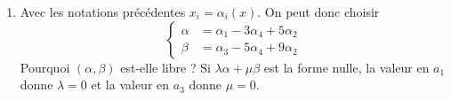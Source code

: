 \begin{enumerate}
 \item Avec les notations précédentes $x_i = \alpha_i(x)$. On peut donc choisir
\begin{displaymath}
 \left\lbrace 
\begin{aligned}
 \alpha   &= \alpha_1 - 3\alpha_4 + 5\alpha_2\\
 \beta   &= \alpha_3 - 5\alpha_4 + 9\alpha_2
\end{aligned}
\right. 
\end{displaymath}
Pourquoi $(\alpha,\beta)$ est-elle libre ? Si $\lambda\alpha +\mu\beta$ est la forme nulle, la valeur en $a_1$ donne $\lambda=0$ et la valeur en $a_3$ donne $\mu=0$.  
\end{enumerate}
